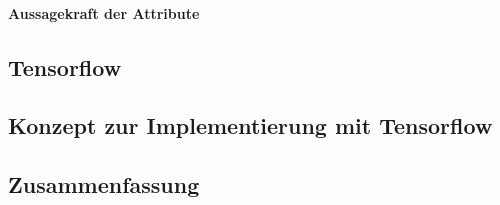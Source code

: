 \paragraph{Aussagekraft der Attribute}


\subsection{Tensorflow}

\subsection{Konzept zur Implementierung mit Tensorflow}

\subsection{Zusammenfassung}
